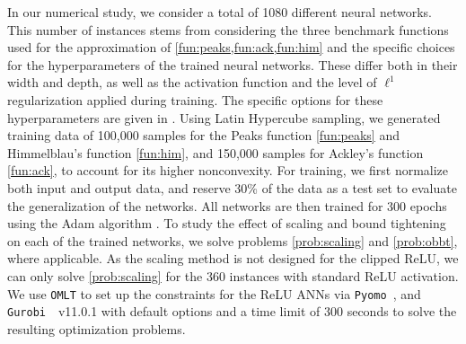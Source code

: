 In our numerical study, we consider a total of 1080 different neural networks. This number of instances stems from considering the three benchmark functions used for the approximation of \cref{fun:peaks,fun:ack,fun:him} and the specific choices for the hyperparameters of the trained neural networks. These differ both in their width and depth, as well as the activation function and the level of $\ell^1$ regularization applied during training. The specific options for these hyperparameters are given in . Using Latin Hypercube sampling, we generated training data of 100,000 samples for the Peaks function \eqref{fun:peaks} and Himmelblau's function \eqref{fun:him}, and 150,000 samples for Ackley's function \eqref{fun:ack}, to account for its higher nonconvexity. For training, we first normalize both input and output data, and reserve 30\% of the data as a test set to evaluate the generalization of the networks. All networks are then trained for 300 epochs using the Adam algorithm \citep{Kingma2017}. To study the effect of scaling and bound tightening on each of the trained networks, we solve problems \eqref{prob:scaling} and \eqref{prob:obbt}, where applicable. As the scaling method is not designed for the clipped ReLU, we can only solve \eqref{prob:scaling} for the 360 instances with standard ReLU activation. We use \texttt{OMLT} \citep{Ceccon2022} to set up the constraints for the ReLU ANNs via \texttt{Pyomo}~\citep{Bynum2021,Hart2011}, and \texttt{Gurobi}~\citep{gurobi}~{v11.0.1} with default options and a time limit of 300 seconds to solve the resulting optimization problems. 
%

